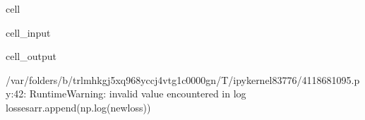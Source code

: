 \documentclass[letterpaper,10pt,english]{jupyterBook}
\begin{document}
\begin{sphinxuseclass}{cell}\begin{sphinxVerbatimInput}

\begin{sphinxuseclass}{cell_input}
\begin{sphinxVerbatim}[commandchars=\\\{\}]
   
          
\end{sphinxVerbatim}

\end{sphinxuseclass}\end{sphinxVerbatimInput}
\begin{sphinxVerbatimOutput}

\begin{sphinxuseclass}{cell_output}
\begin{sphinxVerbatim}[commandchars=\\\{\}]
/var/folders/\PYGZus{}b/trlmhkgj5xq968yccj4vtg1c0000gn/T/ipykernel\PYGZus{}83776/4118681095.py:42: RuntimeWarning: invalid value encountered in log
  losses\PYGZus{}arr.append(np.log(new\PYGZus{}loss))
\end{sphinxVerbatim}

\noindent{}

\end{sphinxuseclass}\end{sphinxVerbatimOutput}

\end{sphinxuseclass}
\end{document}
